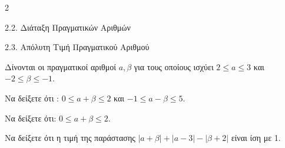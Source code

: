 \begin{ylh}{2}
    \item 2.2. Διάταξη Πραγματικών Αριθμών
    \item 2.3. Απόλυτη Τιμή Πραγματικού Αριθμού
\end{ylh}
Δίνονται οι πραγματικοί αριθμοί $a, \beta$ για τους οποίους ισχύει $2 \le a \le 3$ και $-2 \le \beta \le -1$.
\begin{alist}
\item Να δείξετε ότι : $0 \le a + \beta \le 2$ και $-1 \le a - \beta \le 5$.
\item Να δείξετε ότι: $0 \le a + \beta \le 2$.
\item Να δείξετε ότι η τιμή της παράστασης $|a + \beta| + |a - 3| - |\beta + 2|$ είναι ίση με 1.
\end{alist}

